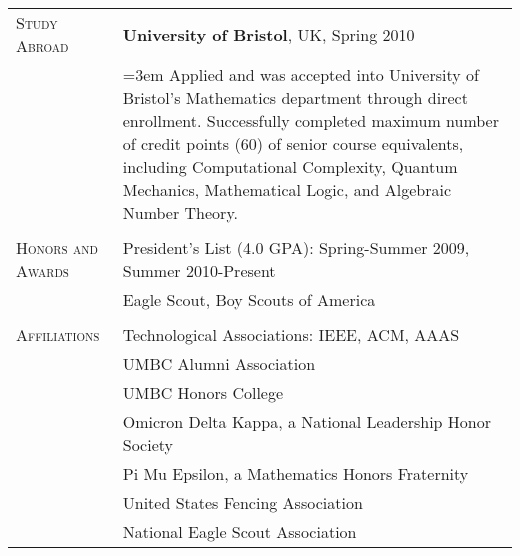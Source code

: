 \begin{tabular}{l p{340pt}}

\textsc{Study Abroad} & \textbf{University of Bristol}, UK, Spring 2010\\
& \hangindent=3em \hangafter=0  Applied and was accepted into University of Bristol's Mathematics department through direct enrollment.  Successfully completed maximum number of credit points (60) of senior course equivalents, including Computational Complexity, Quantum Mechanics, Mathematical Logic, and Algebraic Number Theory.\\
& \\

\textsc{Honors and Awards} & President's List (4.0 GPA): Spring-Summer 2009, Summer 2010-Present\\
& Eagle Scout, Boy Scouts of America\\
& \\


\textsc{Affiliations}
& Technological Associations: IEEE, ACM, AAAS\\
& UMBC Alumni Association\\
& UMBC Honors College\\
& Omicron Delta Kappa, a National Leadership Honor Society\\
& Pi Mu Epsilon, a Mathematics Honors Fraternity\\
& United States Fencing Association\\
& National Eagle Scout Association\\
\end{tabular}

